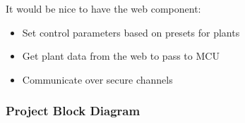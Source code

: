 It would be nice to have the web component:
\begin{itemize}
    \item Set control parameters based on presets for plants
    \item Get plant data from the web to pass to MCU
    \item Communicate over secure channels
\end{itemize}
\subsubsection{Project Block Diagram}